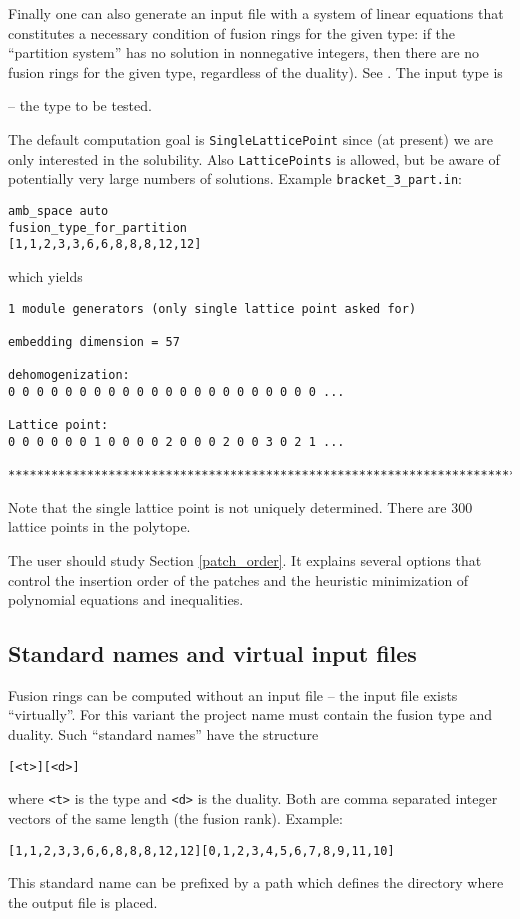 Finally one can also generate an input file with a system of linear equations that constitutes a necessary condition of fusion rings for the given type: if the ``partition system'' has no solution in nonnegative integers, then there are no fusion rings for the given type, regardless of the duality). See \cite{ABPP}. The input type is
\begin{itemize}
	 -- the type to be tested.
\end{itemize}
The default computation goal is \verb*|SingleLatticePoint| since (at present) we are only interested in the solubility. Also \verb*|LatticePoints| is allowed, but be aware of potentially very large numbers of solutions. Example \verb*|bracket_3_part.in|:
\begin{Verbatim}
amb_space auto
fusion_type_for_partition
[1,1,2,3,3,6,6,8,8,8,12,12]
\end{Verbatim}
which yields
\begin{Verbatim}
1 module generators (only single lattice point asked for)

embedding dimension = 57

dehomogenization:
0 0 0 0 0 0 0 0 0 0 0 0 0 0 0 0 0 0 0 0 0 0 ...

Lattice point:
0 0 0 0 0 0 1 0 0 0 0 2 0 0 0 2 0 0 3 0 2 1 ...

***********************************************************************
\end{Verbatim}
Note that the single lattice point is not uniquely determined. 
There are $300$ lattice points in the polytope. 

The user should study Section \ref{patch_order}. It explains several options that control the insertion order of the patches and the heuristic minimization of polynomial equations and inequalities. 


\subsection{Standard names and virtual input files}\label{virtual_input}

Fusion rings can be computed without an input file -- the input file exists ``virtually''. For this variant the project name must contain the fusion type and duality. Such ``standard names'' have the structure
\begin{Verbatim}
[<t>][<d>]
\end{Verbatim}
where \verb*|<t>| is the type and \verb*|<d>| is the duality. Both are comma separated integer vectors of the same length (the fusion rank). Example:
\begin{Verbatim}
[1,1,2,3,3,6,6,8,8,8,12,12][0,1,2,3,4,5,6,7,8,9,11,10]
\end{Verbatim}
This standard name can be prefixed by a path which defines the directory where the output file is placed.

